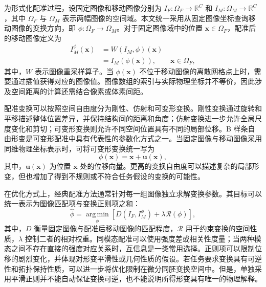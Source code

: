 为形式化配准过程，设固定图像和移动图像分别为
$I_F:\Omega_F\rightarrow\mathbb{R}^{C}$ 和
$I_M:\Omega_M\rightarrow\mathbb{R}^{C}$，其中 $\Omega_F$ 与 $\Omega_M$ 表示两幅图像的空间域。本文统一采用从固定图像坐标查询移动图像的变换方向，即
$\phi:\Omega_F\rightarrow\Omega_M$。对于固定图像域中的位置
$\mathbf{x}\in\Omega_F$，配准后的移动图像定义为
\begin{equation}
\begin{aligned}
I_M^{\phi}(\mathbf{x})
&=W(I_M,\phi)(\mathbf{x}) \\
&=I_M\!\left(\phi(\mathbf{x})\right),
\qquad \mathbf{x}\in\Omega_F ,
\end{aligned}
\label{eq:foundations-reg-warp}
\end{equation}
其中，$W$ 表示图像重采样算子。当 $\phi(\mathbf{x})$ 不位于移动图像的离散网格点上时，需要通过插值获得对应的图像值。图像数组的索引与实际物理坐标并不等价，因此涉及空间距离的计算还需结合像素或体素间距。

配准变换可以按照空间自由度分为刚性、仿射和可变形变换。刚性变换通过旋转和平移描述整体位置差异，并保持结构间的距离和角度；仿射变换进一步允许全局尺度变化和剪切；可变形变换则允许不同空间位置具有不同的局部位移。B 样条自由形变是可变形配准中具有代表性的参数化方式之一\cite{rueckert1999ffd,sotiras2013deformable}。当固定图像与移动图像采用同维物理坐标表示时，可将可变形变换统一写为
\begin{equation}
\phi(\mathbf{x})
=
\mathbf{x}+\mathbf{u}(\mathbf{x}),
\label{eq:foundations-reg-displacement}
\end{equation}
其中，$\mathbf{u}(\mathbf{x})$ 为位置 $\mathbf{x}$ 处的位移向量。更高的变换自由度可以描述复杂的局部形变，但也增加了得到不规则或不符合任务假设的变换的可能性。

在优化方式上，经典配准方法通常针对每一组图像独立求解变换参数。其目标可以统一表示为图像匹配项与变换正则项之和：
\begin{equation}
\widehat{\phi}
=
\operatorname*{arg\,min}_{\phi}
\left[
D\!\left(I_F,I_M^{\phi}\right)
+\lambda\mathcal{R}(\phi)
\right],
\label{eq:foundations-reg-objective}
\end{equation}
其中，$D$ 衡量固定图像与配准后移动图像的匹配程度，$\mathcal{R}$ 用于约束变换的空间性质，$\lambda$ 控制二者的相对权重。同模态配准可以使用强度差或相关性度量；当两种模态之间不存在直接的强度对应关系时，互信息是一类常用选择\cite{rueckert1999ffd,pluim2003mi}。正则项可以限制位移的剧烈变化，并体现对形变平滑性或几何性质的假设。若任务要求变换具有可逆性和拓扑保持性质，可以进一步将优化限制在微分同胚变换空间中\cite{avants2008syn}。但是，单独采用平滑正则并不能自动保证变换可逆，也不能说明所得形变具有唯一的物理解释。


